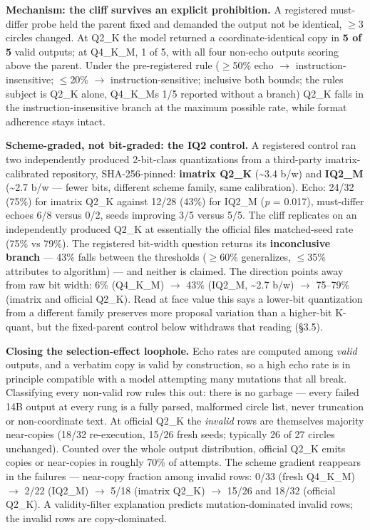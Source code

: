 \textbf{Mechanism: the cliff survives an explicit prohibition.} A registered must-differ probe held the parent fixed and demanded the output not be identical, \(\geq\)3 circles changed. At Q2\_K the model returned a coordinate-identical copy in \textbf{5 of 5} valid outputs; at Q4\_K\_M, 1 of 5, with all four non-echo outputs scoring above the parent. Under the pre-registered rule (\(\geq\)50\% echo \(\rightarrow\) instruction-insensitive; \(\leq\)20\% \(\rightarrow\) instruction-sensitive; inclusive both bounds; the rule\textquotesingle s subject is Q2\_K alone, Q4\_K\_M\textquotesingle s 1/5 reported without a branch) Q2\_K falls in the instruction-insensitive branch at the maximum possible rate, while format adherence stays intact.

\textbf{Scheme-graded, not bit-graded: the IQ2 control.} A registered control ran two independently produced 2-bit-class quantizations from a third-party imatrix-calibrated repository, SHA-256-pinned: \textbf{imatrix Q2\_K} (\textasciitilde3.4 b/w) and \textbf{IQ2\_M} (\textasciitilde2.7 b/w --- fewer bits, different scheme family, same calibration). Echo: 24/32 (75\%) for imatrix Q2\_K against 12/28 (43\%) for IQ2\_M (\emph{p} = 0.017), must-differ echoes 6/8 versus 0/2, seeds improving 3/5 versus 5/5. The cliff replicates on an independently produced Q2\_K at essentially the official file\textquotesingle s matched-seed rate (75\% vs 79\%). The registered bit-width question returns its \textbf{inconclusive branch} --- 43\% falls between the thresholds (\(\geq\)60\% generalizes, \(\leq\)35\% attributes to algorithm) --- and neither is claimed. The direction points away from raw bit width: 6\% (Q4\_K\_M) \(\rightarrow\) 43\% (IQ2\_M, \textasciitilde2.7 b/w) \(\rightarrow\) 75--79\% (imatrix and official Q2\_K). Read at face value this says a lower-bit quantization from a different family preserves more proposal variation than a higher-bit K-quant, but the fixed-parent control below withdraws that reading (§3.5).

\textbf{Closing the selection-effect loophole.} Echo rates are computed among \emph{valid} outputs, and a verbatim copy is valid by construction, so a high echo rate is in principle compatible with a model attempting many mutations that all break. Classifying every non-valid row rules this out: there is no garbage --- every failed 14B output at every rung is a fully parsed, malformed circle list, never truncation or non-coordinate text. At official Q2\_K the \emph{invalid} rows are themselves majority near-copies (18/32 re-execution, 15/26 fresh seeds; typically 26 of 27 circles unchanged). Counted over the whole output distribution, official Q2\_K emits copies or near-copies in roughly 70\% of attempts. The scheme gradient reappears in the failures --- near-copy fraction among invalid rows: 0/33 (fresh Q4\_K\_M) \(\rightarrow\) 2/22 (IQ2\_M) \(\rightarrow\) 5/18 (imatrix Q2\_K) \(\rightarrow\) 15/26 and 18/32 (official Q2\_K). A validity-filter explanation predicts mutation-dominated invalid rows; the invalid rows are copy-dominated.

